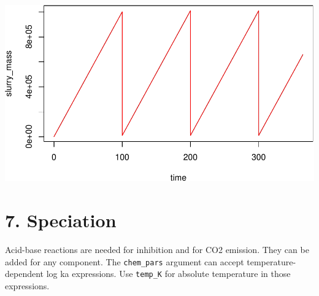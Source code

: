 \documentclass[
]{article}
\begin{document}
\includegraphics{simple_demo_files/figure-latex/unnamed-chunk-52-1.pdf}

\hypertarget{speciation}{%
\section{7. Speciation}\label{speciation}}

Acid-base reactions are needed for inhibition and for CO2 emission. They
can be added for any component. The \texttt{chem\_pars} argument can
accept temperature-dependent log ka expressions. Use \texttt{temp\_K}
for absolute temperature in those expressions.
\end{document}
